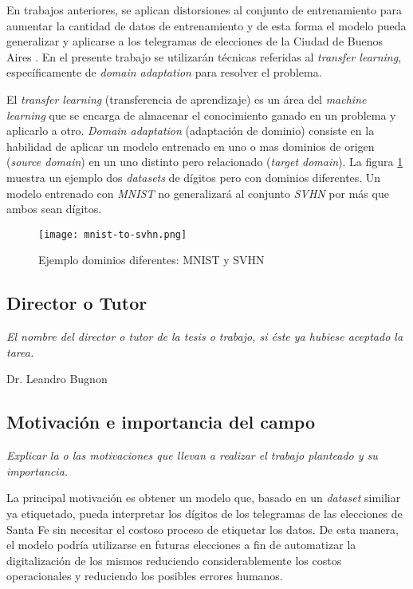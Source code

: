 \documentclass[a4paper, twoside]{report}
\begin{document}
En trabajos anteriores, se aplican distorsiones al conjunto de entrenamiento para aumentar la cantidad de datos de entrenamiento y de esta forma el modelo
pueda generalizar y aplicarse a los telegramas de elecciones de la Ciudad de Buenos Aires \cite{Lamagna2016}. En el presente trabajo se utilizar\'an t\'ecnicas
referidas al {\it transfer learning}, espec\'ificamente de {\it domain adaptation} para resolver el problema.

El {\it transfer learning} (transferencia de aprendizaje) es un \'area del {\it machine learning} que se encarga de almacenar el conocimiento ganado en un
problema y aplicarlo a otro. {\it Domain adaptation} (adaptaci\'on de dominio) consiste en la habilidad de aplicar un modelo entrenado en uno o mas dominios de
origen ({\it source domain}) en un uno distinto pero relacionado ({\it target domain}). La figura \ref{fig:mnist-to-svhn} muestra un ejemplo dos {\it datasets}
de d\'igitos pero con dominios diferentes. Un modelo entrenado con {\it MNIST} no generalizar\'a al conjunto {\it SVHN} por m\'as que ambos sean d\'igitos.

\begin{figure}[ht]
	\centering
	\texttt{[image: mnist-to-svhn.png]}
	\caption{Ejemplo dominios diferentes: MNIST y SVHN}
	\label{fig:mnist-to-svhn}
\end{figure}

\subsection*{Director o Tutor}
{\it El nombre del director o tutor de la tesis o trabajo, si éste ya
	hubiese aceptado la tarea.}

Dr. Leandro Bugnon

\subsection*{Motivación e importancia del campo}
{\it Explicar la o las motivaciones que llevan a realizar el trabajo planteado
	y su importancia.}

La principal motivaci\'on es obtener un modelo que, basado en un {\it dataset} similiar ya etiquetado, pueda interpretar los d\'igitos de los telegramas de las
elecciones de Santa Fe sin necesitar el costoso proceso de etiquetar los datos. De esta manera, el modelo podr\'ia utilizarse en futuras elecciones a fin de
automatizar la digitalizaci\'on de los mismos reduciendo considerablemente los costos operacionales y reduciendo los posibles errores humanos.
\end{document}
